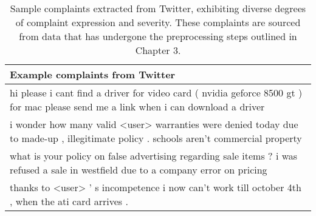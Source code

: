 \begin{table}[ht]
    \captionsetup{font=small}
    \centering
    \begin{tabularx}{\textwidth}{|X|}
        \hline
        \rowcolor[gray]{0.7}
        \textbf{Example complaints from Twitter}                                                                                                                       \\
        \hline
        hi please i cant find a driver for video card ( nvidia geforce 8500 gt ) for mac please send me a link when i can download a driver   \\
        \hline
        i wonder how many valid <user> warranties were denied today due to made-up , illegitimate policy . schools aren't commercial property \\
        \hline
        what is your policy on false advertising regarding sale items ? i was refused a sale in westfield due to a company error on pricing   \\
        \hline
        thanks to <user> ' s incompetence i now can't work till october 4th , when the ati card arrives .                                    \\
        \hline
    \end{tabularx}
    \caption{Sample complaints extracted from Twitter, exhibiting diverse degrees of complaint expression and severity. These complaints are sourced from data that has undergone the preprocessing steps outlined in Chapter 3.}
    \label{tab: ex_complaints}
\end{table}

